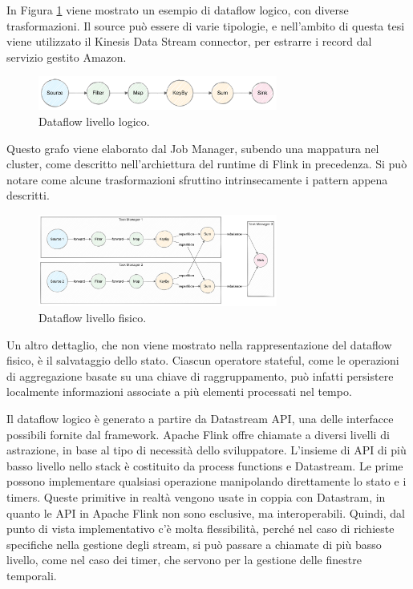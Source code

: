 In Figura \ref{fig:dataflow-l} viene mostrato un esempio di dataflow logico, con diverse trasformazioni. Il source può essere di varie tipologie, e nell'ambito di questa tesi viene utilizzato il Kinesis Data Stream connector, per estrarre i record dal servizio gestito Amazon. %

\begin{figure}[htbp]
    \centering
    \includegraphics[width=0.7\textwidth]{figures/logical-dag.png}
    \caption{Dataflow livello logico.}
    \label{fig:dataflow-l}
\end{figure}  

Questo grafo viene elaborato dal Job Manager, subendo una mappatura nel cluster, come descritto nell'archiettura del runtime di Flink in precedenza. Si può notare come alcune trasformazioni sfruttino intrinsecamente i pattern appena descritti.

\begin{figure}[htbp]
    \centering
    \includegraphics[width=0.7\textwidth]{figures/physical-dataflow-example.png}
    \caption{Dataflow livello fisico.}
    \label{fig:dataflow-phy}
\end{figure}  

Un altro dettaglio, che non viene mostrato nella rappresentazione del dataflow fisico, è il salvataggio dello stato. Ciascun operatore stateful, come le operazioni di aggregazione basate su una chiave di raggruppamento, può infatti persistere localmente informazioni associate a più elementi processati nel tempo. %

Il dataflow logico è generato a partire da Datastream API, una delle interfacce possibili fornite dal framework. Apache Flink offre chiamate a diversi livelli di astrazione, in base al tipo di necessità dello sviluppatore. L'insieme di API di più basso livello nello stack è costituito da process functions e Datastream. Le prime possono implementare qualsiasi operazione manipolando direttamente lo stato e i timers. Queste primitive in realtà vengono usate in coppia con Datastram, in quanto le API in Apache Flink non sono esclusive, ma interoperabili. Quindi, dal punto di vista implementativo c'è molta flessibilità, perché nel caso di richieste specifiche nella gestione degli stream, si può passare a chiamate di più basso livello, come nel caso dei timer, che servono per la gestione delle finestre temporali.


